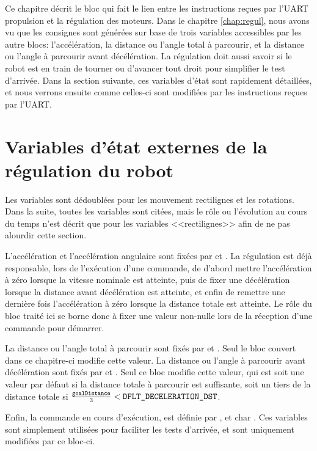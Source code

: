 Ce chapitre décrit le bloc qui fait le lien entre les instructions reçues par l'UART propulsion et la régulation des moteurs. Dans le chapitre \ref{chap:regul}, nous avons vu que les consignes sont générées sur base de trois variables accessibles par les autre blocs: l'accélération, la distance ou l'angle total à parcourir, et la distance ou l'angle à parcourir avant décélération. La régulation doit aussi savoir si le robot est en train de tourner ou d'avancer tout droit pour simplifier le test d'arrivée. Dans la section suivante, ces variables d'état sont rapidement détaillées, et nous verrons ensuite comme celles-ci sont modifiées par les instructions reçues par l'UART.

\section{Variables d'état externes de la régulation du robot}
Les variables sont dédoublées pour les mouvement rectilignes et les rotations. Dans la suite, toutes les variables sont citées, mais le rôle ou l'évolution au cours du temps n'est décrit que pour les variables <<rectilignes>> afin de ne pas alourdir cette section.

L'accélération et l'accélération angulaire sont fixées par  et . La régulation est déjà responsable, lors de l'exécution d'une commande, de d'abord mettre l'accélération à zéro lorsque la vitesse nominale est atteinte, puis de fixer une décélération lorsque la distance avant décélération est atteinte, et enfin de remettre une dernière fois l'accélération à zéro lorsque la distance totale est atteinte. Le rôle du bloc traité ici se borne donc à fixer une valeur non-nulle lors de la réception d'une commande pour démarrer.

La distance ou l'angle total à parcourir sont fixés par  et . Seul le bloc couvert dans ce chapitre-ci modifie cette valeur. La distance ou l'angle à parcourir avant décélération sont fixés par  et . Seul ce bloc modifie cette valeur, qui est soit une valeur par défaut si la distance totale à parcourir est suffisante, soit un tiers de la distance totale si $\frac{\text{\texttt{goalDistance}}}{3}<\text{\texttt{DFLT\_DECELERATION\_DST}}$.

Enfin, la commande en cours d'exécution, est définie par , et char . Ces variables sont simplement utilisées pour faciliter les tests d'arrivée, et sont uniquement modifiées par ce bloc-ci.

